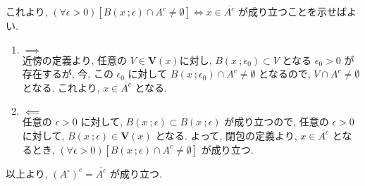 {これより, $(\forall \epsilon > 0)[B(x\ ;\epsilon) \cap A^c \neq \emptyset] \iff x \in \overline{A^c}$ が成り立つことを示せばよい.
\begin{enumerate}
    \item $\implies$\\
    近傍の定義より, 任意の $V \in \bm{V}(x)$に対し, $B(x\ ;\epsilon_0) \subset V$ となる $\epsilon_0 > 0$ が存在するが, 今, この $\epsilon_0$ に対して $B(x\ ;\epsilon_0) \cap A^c \neq \emptyset$
    となるので, $V \cap A^c \neq \emptyset$ となる. これより, $x \in \overline{A^c}$ となる.
    \item $\impliedby$\\ 
    任意の $\epsilon > 0$ に対して, $B(x\ ;\epsilon) \subset B(x\ ;\epsilon)$ が成り立つので, 任意の $\epsilon > 0$ に対して, $B(x\ ;\epsilon) \in \bm{V}(x)$ となる.
    よって, 閉包の定義より, $x \in \overline{A^c}$ となるとき, $(\forall \epsilon > 0)[B(x\ ;\epsilon) \cap A^c \neq \emptyset]$ が成り立つ.
\end{enumerate}
以上より, $(A^\circ)^c = \overline{A^c}$ が成り立つ.
}

